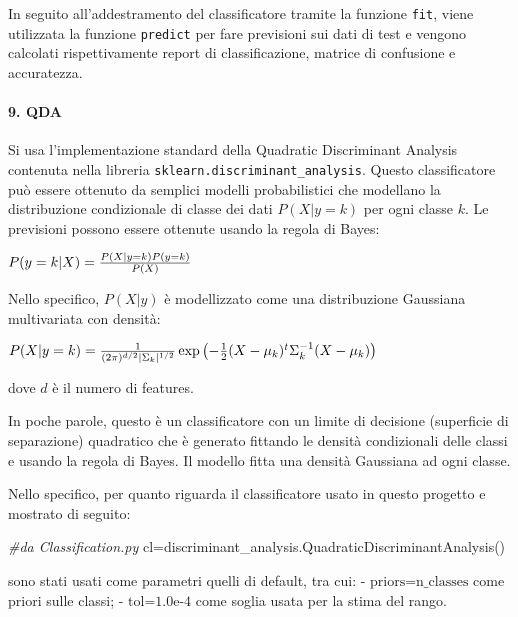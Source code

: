\documentclass[11pt]{article}
\newenvironment{Shaded}{}{}
\newcommand{\CommentTok}[1]{\textcolor[rgb]{0.38,0.63,0.69}{\textit{{#1}}}}
\newcommand{\NormalTok}[1]{{#1}}
\newcommand{\OperatorTok}[1]{\textcolor[rgb]{0.40,0.40,0.40}{{#1}}}
\begin{document}
In seguito all'addestramento del classificatore tramite la funzione
\texttt{fit}, viene utilizzata la funzione \texttt{predict} per fare
previsioni sui dati di test e vengono calcolati rispettivamente report
di classificazione, matrice di confusione e accuratezza.

    \paragraph{9. QDA}\label{qda}

    Si usa l'implementazione standard della Quadratic Discriminant Analysis
contenuta nella libreria \texttt{sklearn.discriminant\_analysis}. Questo
classificatore può essere ottenuto da semplici modelli probabilistici
che modellano la distribuzione condizionale di classe dei dati
\(P(X|y=k)\) per ogni classe \(k\). Le previsioni possono essere
ottenute usando la regola di Bayes:

\(\begin{equation*} P(y=k | X) = \frac{P(X | y=k) P(y=k)}{P(X)} \\ \end{equation*}\)

Nello specifico, \(P(X|y)\) è modellizzato come una distribuzione
Gaussiana multivariata con densità:

\(\begin{equation*} P(X | y=k) = \frac{1}{(2\pi)^{d/2} |\Sigma_k|^{1/2}}\exp\left(-\frac{1}{2} (X-\mu_k)^t \Sigma_k^{-1} (X-\mu_k)\right) \\ \end{equation*}\)

dove \(d\) è il numero di features.

In poche parole, questo è un classificatore con un limite di decisione
(superficie di separazione) quadratico che è generato fittando le
densità condizionali delle classi e usando la regola di Bayes. Il
modello fitta una densità Gaussiana ad ogni classe.

Nello specifico, per quanto riguarda il classificatore usato in questo
progetto e mostrato di seguito:

\begin{Shaded}
\begin{Highlighting}[]
\CommentTok{#da Classification.py}
\NormalTok{cl}\OperatorTok{=}\NormalTok{discriminant_analysis.QuadraticDiscriminantAnalysis()      }
\end{Highlighting}
\end{Shaded}

sono stati usati come parametri quelli di default, tra cui: -
\(\text{priors=n_classes}\) come priori sulle classi; -
\(\text{tol=1.0e-4}\) come soglia usata per la stima del rango.
\end{document}
